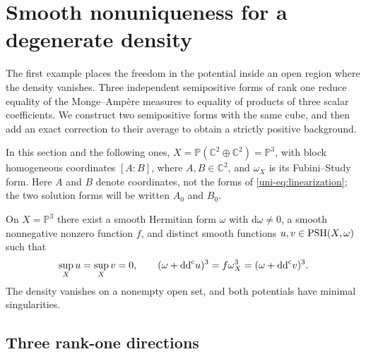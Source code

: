 \section{Smooth nonuniqueness for a degenerate density}
\label{sec:degenerate-hermitian-nonuniqueness}

The first example places the freedom in the potential inside an open region where the density vanishes. Three independent semipositive forms of rank one reduce equality of the Monge--Amp\`ere measures to equality of products of three scalar coefficients. We construct two semipositive forms with the same cube, and then add an exact correction to their average to obtain a strictly positive background.

In this section and the following ones, $X=\mathbb P(\mathbb C^2\oplus\mathbb C^2)=\mathbb P^3$, with block homogeneous coordinates $[A:B]$, where $A,B\in\mathbb C^2$, and $\omega_X$ is its Fubini--Study form. Here $A$ and $B$ denote coordinates, not the forms of \eqref{uni-eq:linearization}; the two solution forms will be written $A_0$ and $B_0$.

\begin{theorem}\label{thm:degenerate-hermitian-nonuniqueness}
On $X=\mathbb P^3$ there exist a smooth Hermitian form $\omega$ with $\mathrm{d}\omega\ne0$, a smooth nonnegative nonzero function $f$, and distinct smooth functions $u,v\in\mathrm{PSH}(X,\omega)$ such that
\[
 \sup_Xu=\sup_Xv=0,\qquad
 (\omega+\mathrm{dd}^{\mathrm{c}} u)^3=f\omega_X^3=(\omega+\mathrm{dd}^{\mathrm{c}} v)^3.
\]
The density vanishes on a nonempty open set, and both potentials have minimal singularities.
\end{theorem}

\subsection{Three rank-one directions}
\label{subsec:numa-rank-directions}

